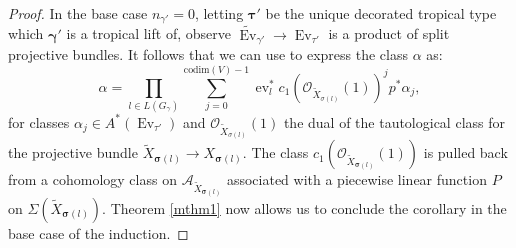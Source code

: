 \documentclass[12pt, oneside]{amsart}   	%
\newcounter{thm}
\newcommand{\ev}{\operatorname{ev}}
\newcommand{\Ev}{\operatorname{Ev}}
\numberwithin{equation}{section}
\numberwithin{thm}{section}
\numberwithin{figure}{section}
\begin{document}
\begin{proof}




In the base case $n_{\gamma'} = 0$, letting $\pmb\tau'$ be the unique decorated tropical type which $\pmb\gamma'$ is a tropical lift of, observe $\widetilde{\Ev}_{\gamma'} \rightarrow \Ev_{\tau'}$ is a product of split projective bundles. It follows that we can use \cite[Theorem $3.3(b)$]{Fulint} to express the class $\alpha$ as:
\[\alpha = \prod_{l \in L(G_{\gamma})}\sum_{j=0}^{\text{codim}(V)-1} \ev_{l}^*c_1(\mathcal{O}_{\widetilde{X}_{\sigma(l)}}(1))^jp^*\alpha_j,\]
for classes $\alpha_j \in A^*(\Ev_{\tau'})$ and $\mathcal{O}_{\widetilde{X}_{\sigma(l)}}(1)$ the dual of the tautological class for the projective bundle $\widetilde{X}_{\pmb\sigma(l)} \rightarrow X_{\pmb\sigma(l)}$. The class $c_1(\mathcal{O}_{\widetilde{X}_{\pmb\sigma(l)}}(1))$ is pulled back from a cohomology class on $\mathcal{A}_{\widetilde{X}_{\pmb\sigma(l)}}$ associated with a piecewise linear function $P$ on $\Sigma(\widetilde{X}_{\pmb\sigma(l)})$. Theorem \ref{mthm1} now allows us to conclude the corollary in the base case of the induction.







\end{proof}
\end{document}
